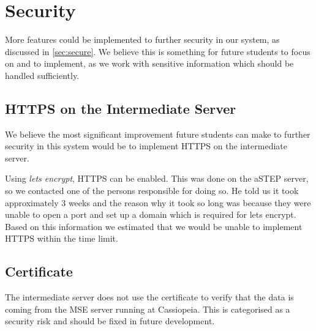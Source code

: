\section{Security}\label{sec:fucture_secure}
More features could be implemented to further security in our system, as discussed in \cref{sec:secure}. We believe this is something for future students to focus on and to implement, as we work with sensitive information which should be handled sufficiently.

\subsection*{HTTPS on the Intermediate Server}
We believe the most significant improvement future students can make to further security in this system would be to implement HTTPS on the intermediate server.

Using \emph{lets encrypt}, HTTPS can be enabled. This was done on the aSTEP server, so we contacted one of the persons responsible for doing so. He told us it took approximately 3 weeks and the reason why it took so long was because they were unable to open a port and set up a domain which is required for lets encrypt. 
Based on this information we estimated that we would be unable to implement HTTPS within the time limit.

\subsection*{Certificate}
The intermediate server does not use the certificate to verify that the data is coming from the MSE server running at Cassiopeia. This is categorised as a security risk and should be fixed in future development.